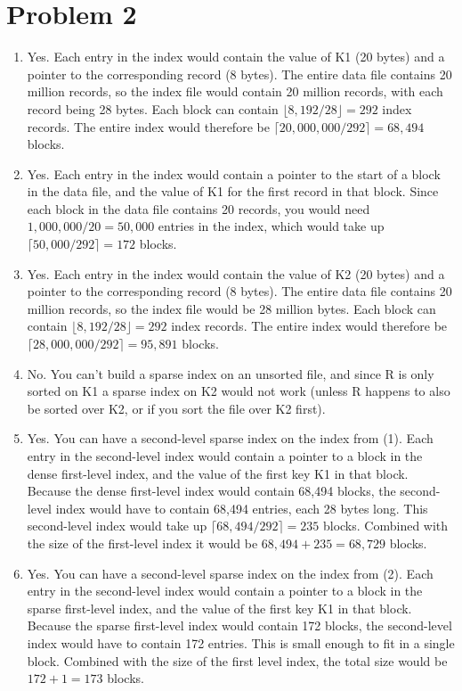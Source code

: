 \documentclass[a4paper, 12pt]{article}
\begin{document}
\section*{Problem 2}

\begin{enumerate}
	\item Yes. Each entry in the index would contain the value of K1 (20 bytes)
			and a pointer to the corresponding record (8 bytes). The entire data
			file contains 20 million records, so the index file would contain 20
			million records, with each record being 28 bytes. Each block can
			contain $\lfloor 8,192 / 28 \rfloor = 292$ index records. The entire
			index would therefore be $\lceil 20,000,000 / 292 \rceil = 68,494$
			blocks.
	\item Yes. Each entry in the index would contain a pointer to the start of a
			block in the data file, and the value of K1 for the first record in
			that block. Since each block in the data file contains 20 records,
			you would need $1,000,000 / 20 = 50,000$ entries in the index, which
			would take up $\lceil 50,000 / 292 \rceil = 172$ blocks.
	\item Yes. Each entry in the index would contain the value of K2 (20 bytes)
			and a pointer to the corresponding record (8 bytes). The entire data
			file contains 20 million records, so the index file would be 28
			million bytes. Each block can contain $\lfloor 8,192 / 28 \rfloor =
			292$ index records. The entire index would therefore be $\lceil
			28,000,000 / 292 \rceil = 95,891$ blocks.
	\item No. You can't build a sparse index on an unsorted file, and since R is
			only sorted on K1 a sparse index on K2 would not work (unless R
			happens to also be sorted over K2, or if you sort the file over K2
			first).
	\item Yes. You can have a second-level sparse index on the index from (1).
			Each entry in the second-level index would contain a pointer to a
			block in the dense first-level index, and the value of the first key
			K1 in that block. Because the dense first-level index would contain
			68,494 blocks, the second-level index would have to contain 68,494
			entries, each 28 bytes long. This second-level index would take up
			$\lceil 68,494 / 292 \rceil = 235$ blocks. Combined with the size of
			the first-level index it would be $68,494 + 235 = 68,729$
			blocks.
	\item Yes. You can have a second-level sparse index on the index from (2).
			Each entry in the second-level index would contain a pointer to a
			block in the sparse first-level index, and the value of the first
			key K1 in that block. Because the sparse first-level index would
			contain 172 blocks, the second-level index would have to contain 172
			entries. This is small enough to fit in a single block. Combined
			with the size of the first level index, the total size would be $172
			+ 1 = 173$ blocks.
\end{enumerate}
\end{document}
